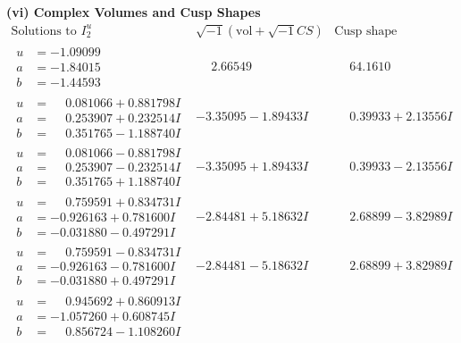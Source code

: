 \documentclass[1p]{elsarticle_modified}
\theoremstyle{definition}
\newcommand{\I}{\sqrt{-1}}
\begin{document}
\newpage\flushleft \textbf{(vi) Complex Volumes and Cusp Shapes}
$$\begin{array}{c|c|c}  
\text{Solutions to }I^u_{2}& \I (\text{vol} + \sqrt{-1}CS) & \text{Cusp shape}\\
 \hline 
\begin{aligned}
u &= -1.09099\phantom{ +0.000000I} \\
a &= -1.84015\phantom{ +0.000000I} \\
b &= -1.44593\phantom{ +0.000000I}\end{aligned}
 & \phantom{-}2.66549\phantom{ +0.000000I} & \phantom{-}64.1610\phantom{ +0.000000I} \\ \hline\begin{aligned}
u &= \phantom{-}0.081066 + 0.881798 I \\
a &= \phantom{-}0.253907 + 0.232514 I \\
b &= \phantom{-}0.351765 - 1.188740 I\end{aligned}
 & -3.35095 - 1.89433 I & \phantom{-}0.39933 + 2.13556 I \\ \hline\begin{aligned}
u &= \phantom{-}0.081066 - 0.881798 I \\
a &= \phantom{-}0.253907 - 0.232514 I \\
b &= \phantom{-}0.351765 + 1.188740 I\end{aligned}
 & -3.35095 + 1.89433 I & \phantom{-}0.39933 - 2.13556 I \\ \hline\begin{aligned}
u &= \phantom{-}0.759591 + 0.834731 I \\
a &= -0.926163 + 0.781600 I \\
b &= -0.031880 - 0.497291 I\end{aligned}
 & -2.84481 + 5.18632 I & \phantom{-}2.68899 - 3.82989 I \\ \hline\begin{aligned}
u &= \phantom{-}0.759591 - 0.834731 I \\
a &= -0.926163 - 0.781600 I \\
b &= -0.031880 + 0.497291 I\end{aligned}
 & -2.84481 - 5.18632 I & \phantom{-}2.68899 + 3.82989 I \\ \hline\begin{aligned}
u &= \phantom{-}0.945692 + 0.860913 I \\
a &= -1.057260 + 0.608745 I \\
b &= \phantom{-}0.856724 - 1.108260 I\end{aligned}

\end{array}$$
\end{document}

